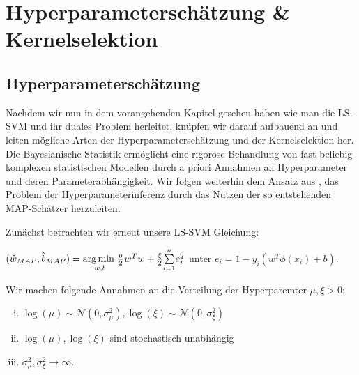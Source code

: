 




\newpage
\thispagestyle{plain}
\section{Hyperparameterschätzung \& Kernelselektion}
\subsection{Hyperparameterschätzung}

Nachdem wir nun in dem vorangehenden Kapitel gesehen haben wie man die LS-SVM und ihr duales Problem herleitet, knüpfen wir darauf aufbauend an und leiten mögliche Arten der Hyperparameterschätzung und der Kernelselektion her. \\
Die Bayesianische Statistik ermöglicht eine rigorose Behandlung von fast beliebig komplexen statistischen Modellen durch a priori Annahmen an Hyperparameter und deren Parameterabhängigkeit. Wir folgen weiterhin dem Ansatz aus \cite{LS-SVM}, das Problem der Hyperparameterinferenz durch das Nutzen der so entstehenden MAP-Schätzer herzuleiten.

Zunächst betrachten wir erneut unsere LS-SVM Gleichung:

\begin{center}
	$(\hat{w}_{MAP},\hat{b}_{MAP})  = \underset{w,b}{\arg \min \hspace{0.1cm}} 					 \frac{\mu}{2}w^Tw + \frac{\xi}{2}\underset{i=1}{\overset{n}{\sum}}e_i^2$
	unter $e_i = 1 - y_i(w^T \phi(x_i) +b)$.
\end{center}

Wir machen folgende Annahmen an die Verteilung der Hyperparemter $\mu, \xi >0$:

\begin{enumerate}[(i)]
	\item $\log(\mu) \sim \mathcal{N}(0, \sigma_\mu^2), \log(\xi) \sim \mathcal{N}(0, 				  \sigma_\xi^2)$ 
	\item $\log(\mu), \log(\xi)$ sind stochastisch unabhängig
	\item $\sigma_\mu^2, \sigma_\xi^2 \rightarrow \infty$.
\end{enumerate}

